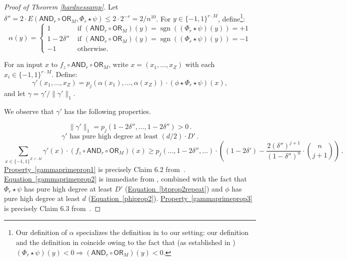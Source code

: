 \documentclass[11pt]{article}
\numberwithin{equation}{section}
\theoremstyle{definition}
\theoremstyle{plain}
\newcommand{\expeqref}[2]{\hyperref[#2]{#1~\eqref{#2}}}
\newcommand{\sgn}{\mathrm{sign}}
\newcommand{\OR}{\mathsf{ OR}}
\newcommand{\bits}{\{-1,1\}}
\newcommand{\ls}{\star}
\newcommand{\AND}{\mathsf{AND}}
\renewcommand{\sgn}{\operatorname{sgn}}
\begin{document}
\begin{proof}[Proof of Theorem \ref{hardnessamp}]
	Let $\delta''=2 \cdot E(\AND_r \circ \OR_M, \Phi_r \ls \psi) \leq 2 \cdot 2^{-r} = 2/n^{10}$.
	For $y \in \bits^{r \cdot M}$, define\footnote{Our definition of $\alpha$ specializes the definition in \cite[Page 39]{sherstovdp}
		to our setting: our definition and the definition in \cite[Page 39]{sherstovdp} coincide owing to the fact that (as established in \cite[Theorem 1]{bt14})
		$(\Phi_r \ls \psi)(y) < 0 \Longrightarrow \left(\AND_r \circ \OR_M\right)(y) < 0$.}:
	$$\alpha(y)=\begin{cases} 1 & \text { if } (\AND_r \circ \OR_M)(y) = \sgn((\Phi_r \ls \psi)(y)) = +1\\
	1-2\delta'' & \text { if } (\AND_r \circ \OR_M)(y) = \sgn((\Phi_r \ls \psi)(y)) = -1\\
	-1 & \text{ otherwise.} \end{cases}$$

	For an input $x$ to $f_z \circ \AND_{r} \circ \OR_M$, 
	write $x=(x_1, \dots, x_Z)$ with each $x_i \in \bits^{r \cdot M}$. 
	Define:
	$$\gamma'(x_1, \dots, x_Z) = p_j\left(\alpha(x_1), \dots, \alpha(x_Z)\right) \cdot \left( \phi \ls \Phi_r \ls \psi\right) (x),$$
	and let $\gamma = \gamma'/\|\gamma'\|_1$.
	
	We observe that $\gamma'$ has the following properties. %
	
	\begin{equation}
	\label{gammaprimeprop1}
	\|\gamma'\|_1 = p_j(1-2\delta'', \dots, 1-2\delta'') > 0\,.
	\end{equation}
	\begin{equation}
	\label{gammaprimeprop2}
	\gamma' \text{ has pure high degree at least } (d/2) \cdot D'\,.
	\end{equation}
	\begin{equation}
	\label{gammaprimeprop3}
	\sum_{x \in \bits^{Z \cdot r \cdot M}} \gamma'(x) \cdot \left(f_z \circ \AND_r \circ \OR_M\right)(x) \geq p_j\left(\dots, 1-2\delta'', \dots\right) \cdot \left( (1-2\delta') - \frac{2 (\delta'')^{j+1}}{(1-\delta'')^n} \cdot {n \choose j+1}\right)\,.
	\end{equation}
	\expeqref{Property}{gammaprimeprop1} is precisely Claim 6.2 from~\cite{sherstovdp}.
	\expeqref{Equation}{gammaprimeprop2} is immediate from \cite[Equation 6.7]{sherstovdp}, combined
with the fact that $\Phi_r \ls \psi$ has pure high degree at least $D'$
     (\expeqref{Equation}{btprop2repeat})
	and $\phi$ has pure high degree at least $d$ 
	(\expeqref{Equation}{phiprop2}). 
	\expeqref{Property}{gammaprimeprop3} is precisely Claim 6.3 from~\cite{sherstovdp}. 
	

\end{proof}
\end{document}
